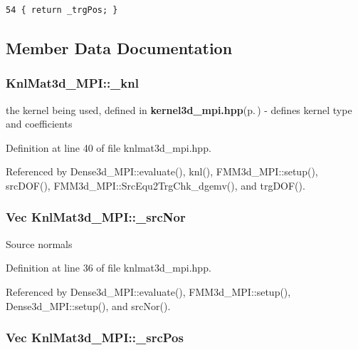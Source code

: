 \footnotesize\begin{verbatim}54 { return _trgPos; }
\end{verbatim}\normalsize 




\subsection{Member Data Documentation}
\subsubsection{ {\bf Knl\-Mat3d\_\-MPI::\_\-knl}\hspace{0.3cm}{\tt  [protected]}}\label{classKnlMat3d__MPI_cb56a4f532a89bc1a51ee17c2434a106_cb56a4f532a89bc1a51ee17c2434a106}


the kernel being used, defined in {\bf kernel3d\_\-mpi.hpp}{\rm (p.\,\pageref{kernel3d__mpi_8hpp})} - defines kernel type and coefficients 

Definition at line 40 of file knlmat3d\_\-mpi.hpp.

Referenced by Dense3d\_\-MPI::evaluate(), knl(), FMM3d\_\-MPI::setup(), src\-DOF(), FMM3d\_\-MPI::Src\-Equ2Trg\-Chk\_\-dgemv(), and trg\-DOF().
\subsubsection{\setlength{\rightskip}{0pt plus 5cm}Vec {\bf Knl\-Mat3d\_\-MPI::\_\-src\-Nor}\hspace{0.3cm}{\tt  [protected]}}\label{classKnlMat3d__MPI_bbeec6db21041e1b277f4755f21047dd_bbeec6db21041e1b277f4755f21047dd}


Source normals 

Definition at line 36 of file knlmat3d\_\-mpi.hpp.

Referenced by Dense3d\_\-MPI::evaluate(), FMM3d\_\-MPI::setup(), Dense3d\_\-MPI::setup(), and src\-Nor().
\subsubsection{\setlength{\rightskip}{0pt plus 5cm}Vec {\bf Knl\-Mat3d\_\-MPI::\_\-src\-Pos}\hspace{0.3cm}{\tt  [protected]}}\label{classKnlMat3d__MPI_f66b814fdf8eb17df56ff5ff27a368da_f66b814fdf8eb17df56ff5ff27a368da}



